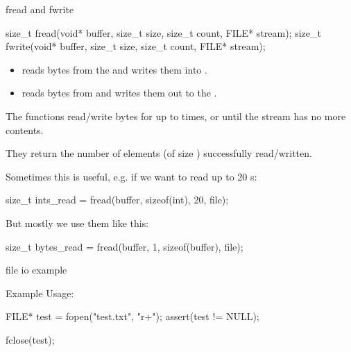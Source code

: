 \documentclass[10pt,graphics,aspectratio=169,table]{beamer}
\begin{document}
\begin{frame}[fragile]{fread and fwrite}
    \begin{small}

    \begin{codeblock}[numbers=none, basicstyle=\small]
size_t fread(void* buffer, size_t size, size_t count, FILE* stream);
size_t fwrite(void* buffer, size_t size, size_t count, FILE* stream);
    \end{codeblock}

    \begin{itemize}
        \item {} reads bytes from the  and writes them into 
        .  

        \item {} reads bytes from  and writes them out to the 
        . 
    
    \end{itemize}

    The functions read/write  bytes for up to  times, or until 
    the stream has no more contents.

    They return the number of elements 
    (of size ) successfully read/written.

    Sometimes this is useful, e.g. if we want to read up to 20 s:
    \begin{codeblock}[numbers=none, basicstyle=\small]
size_t ints_read = fread(buffer, sizeof(int), 20, file);
    \end{codeblock}

    But mostly we use them like this:
    \begin{codeblock}[numbers=none, basicstyle=\small]
size_t bytes_read = fread(buffer, 1, sizeof(buffer), file);
    \end{codeblock}

    \end{small}
    
\end{frame}

\begin{frame}[fragile]{file io example}
     
    Example Usage:
    \begin{codeblock}
        FILE* test = fopen("test.txt", "r+");
        assert(test != NULL);
       
        fclose(test);
    \end{codeblock}

\end{frame}
\end{document}
